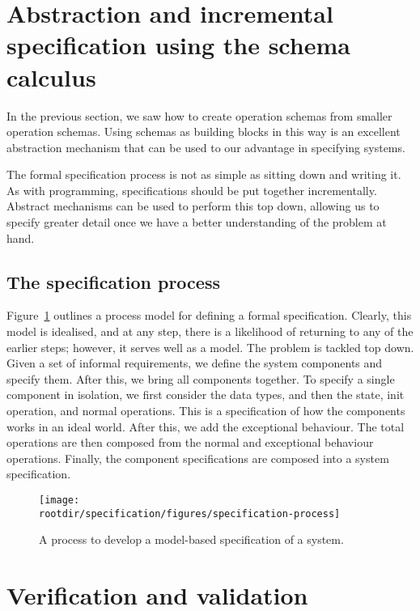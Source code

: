 \section{Abstraction and incremental specification using the schema calculus}

In the previous section, we saw how to create operation schemas from smaller operation schemas. Using schemas as building blocks in this way is an excellent abstraction mechanism that can be used to our advantage in specifying systems.

The formal specification process is not as simple as sitting down and writing it. As with programming, specifications should be put together incrementally. Abstract mechanisms can be used to perform this top down, allowing us to specify greater detail once we have a better understanding of the problem at hand.

\subsection{The specification process}

Figure~\ref{fig:specification:specification-process} outlines a process model for defining a formal specification. Clearly, this model is idealised, and at any step, there is a likelihood of returning to any of the earlier steps; however, it serves well as a model. The problem is tackled top down. Given a set of informal requirements, we define the system components and specify them. After this, we bring all components together. To specify a single component in isolation, we first consider the data types, and then the state, init operation, and normal operations. This is a specification of how the components works in an ideal world. After this, we add the exceptional behaviour. The total operations are then composed from the normal and exceptional behaviour operations. Finally, the component specifications are composed into a system specification.

\begin{figure}[!h]
\texttt{[image: \\rootdir/specification/figures/specification-process]}
\label{fig:specification:specification-process}
\caption{A process to develop a model-based specification of a system.}
\end{figure}

\section{Verification and validation}

